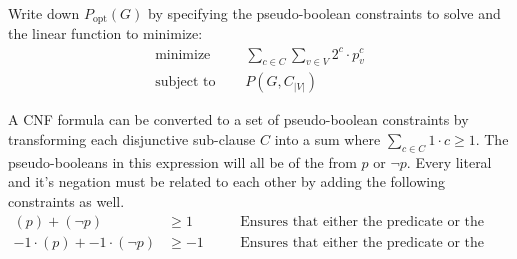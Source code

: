 \documentclass{article}
\newenvironment{solution}{\color{blue} \em }{}
\begin{document}
\begin{enumerate}
	Write down  $P_{\text{opt}}(G)$ by specifying the pseudo-boolean constraints to solve and the linear function to minimize:
    \begin{solution}
	\begin{align*}
        \text{minimize}  	 \quad& \sum_{c \in C}\sum_{v \in V} 2^c \cdot p^c_v \\
    \text{subject to } \quad&  P(G, C_{|V|})
	\end{align*}
	
	A CNF formula can be converted to a set of pseudo-boolean constraints by transforming each disjunctive sub-clause $C$ into a sum where $\sum_{c \in C} 1 \cdot c \geq 1$. The pseudo-booleans in this expression will all be of the from $p$ or $\neg p$. Every literal and it's negation must be related to each other by adding the following constraints as well.
	\begin{align*}
	(p) + (\neg p) &\geq 1 \quad&& \text{Ensures that either the predicate or the negation is true}\\
	-1 \cdot (p) + -1 \cdot (\neg p) &\geq -1 \quad&& \text{Ensures that either the predicate or the negation is false}
	\end{align*} 
    \end{solution}




\end{enumerate}
\end{document}
